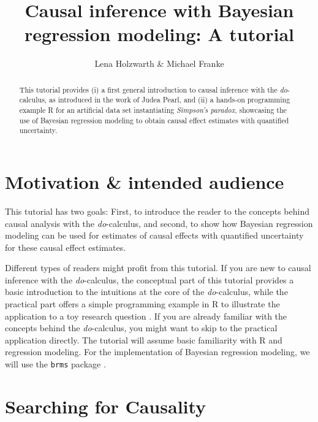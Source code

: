 \documentclass[nobib]{tufte-handout}
\title{Causal inference with Bayesian regression modeling: A tutorial}
\author{Lena Holzwarth \& Michael Franke}
\date{}
\newcommand{\docalc}{\emph{do}-calculus\xspace}
\begin{document}
\maketitle

\begin{abstract}
\noindent 
This tutorial provides (i) a first general introduction to causal inference with the \docalc, as introduced in the work of Judea Pearl, and (ii) a hands-on programming example R for an artificial data set instantiating \emph{Simpson's paradox}, showcasing the use of Bayesian regression modeling to obtain causal effect estimates with quantified uncertainty.
\end{abstract}

\section{Motivation \& intended audience}

This tutorial has two goals: First, to introduce the reader to the concepts behind causal analysis with the \docalc \citep{pearl2000models}, and second, to show how Bayesian regression modeling can be used for estimates of causal effects with quantified uncertainty for these causal effect estimates.

Different types of readers might profit from this tutorial.
If you are new to causal inference with the \docalc, the conceptual part of this tutorial provides a basic introduction to the intuitions at the core of the \docalc, while the practical part offers a simple programming example in R to illustrate the application to a toy research question \citep{R}. 
If you are already familiar with the concepts behind the \docalc, you might want to skip to the practical application directly. 
The tutorial will assume basic familiarity with R and regression modeling. 
For the implementation of Bayesian regression modeling, we will use the \texttt{brms} package \citep{brms}.

\section{Searching for Causality}
\end{document}
